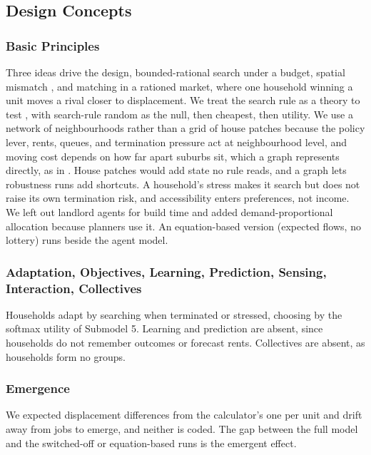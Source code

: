 \documentclass[10pt,a4paper]{article}
\begin{document}
\subsection*{Design Concepts}

\subsubsection*{Basic Principles}

Three ideas drive the design, bounded-rational search \citep{26} under a budget, spatial mismatch \citep{6,7}, and matching in a rationed market, where one household winning a unit moves a rival closer to displacement. We treat the search rule as a theory to test \citep{27,28}, with search-rule random as the null, then cheapest, then utility. We use a network of neighbourhoods rather than a grid of house patches because the policy lever, rents, queues, and termination pressure act at neighbourhood level, and moving cost depends on how far apart suburbs sit, which a graph represents directly, as in \citep{21}. House patches would add state no rule reads, and a graph lets robustness runs add shortcuts. A household's stress makes it search but does not raise its own termination risk, and accessibility enters preferences, not income. We left out landlord agents for build time and added demand-proportional allocation because planners use it. An equation-based version (expected flows, no lottery) runs beside the agent model.

\subsubsection*{Adaptation, Objectives, Learning, Prediction, Sensing, Interaction, Collectives}

Households adapt by searching when terminated or stressed, choosing by the softmax utility of Submodel 5. Learning and prediction are absent, since households do not remember outcomes or forecast rents. Collectives are absent, as households form no groups.

\subsubsection*{Emergence}

We expected displacement differences from the calculator's one per unit and drift away from jobs to emerge, and neither is coded. The gap between the full model and the switched-off or equation-based runs is the emergent effect.
\end{document}
